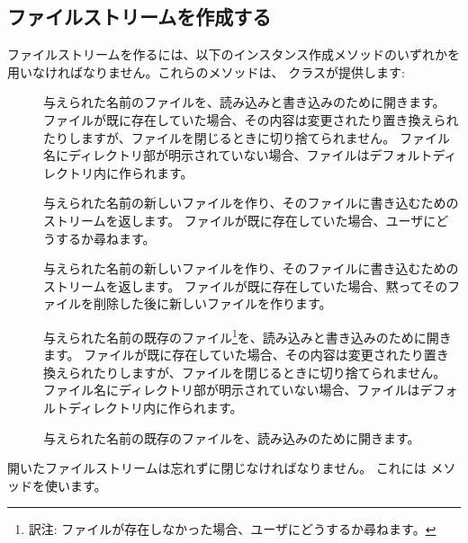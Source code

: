 \documentclass[a4paper,10pt,twoside]{book}
\begin{document}
\subsection{ファイルストリームを作成する}

ファイルストリームを作るには、以下のインスタンス作成メソッドのいずれかを用いなければなりません。これらのメソッドは、 クラスが提供します:

\begin{description}

\item[] 与えられた名前のファイルを、読み込みと書き込みのために開きます。
  ファイルが既に存在していた場合、その内容は変更されたり置き換えられたりしますが、ファイルを閉じるときに切り捨てられません。
  ファイル名にディレクトリ部が明示されていない場合、ファイルはデフォルトディレクトリ内に作られます。
  
\item[] 与えられた名前の新しいファイルを作り、そのファイルに書き込むためのストリームを返します。
  ファイルが既に存在していた場合、ユーザにどうするか尋ねます。
  
\item[] 与えられた名前の新しいファイルを作り、そのファイルに書き込むためのストリームを返します。
  ファイルが既に存在していた場合、黙ってそのファイルを削除した後に新しいファイルを作ります。

\item[] 与えられた名前の既存のファイル\footnote{訳注: ファイルが存在しなかった場合、ユーザにどうするか尋ねます。}を、読み込みと書き込みのために開きます。
  ファイルが既に存在していた場合、その内容は変更されたり置き換えられたりしますが、ファイルを閉じるときに切り捨てられません。
  ファイル名にディレクトリ部が明示されていない場合、ファイルはデフォルトディレクトリ内に作られます。

\item[] 与えられた名前の既存のファイルを、読み込みのために開きます。

\end{description}

開いたファイルストリームは忘れずに閉じなければなりません。
これには  メソッドを使います。
\end{document}
